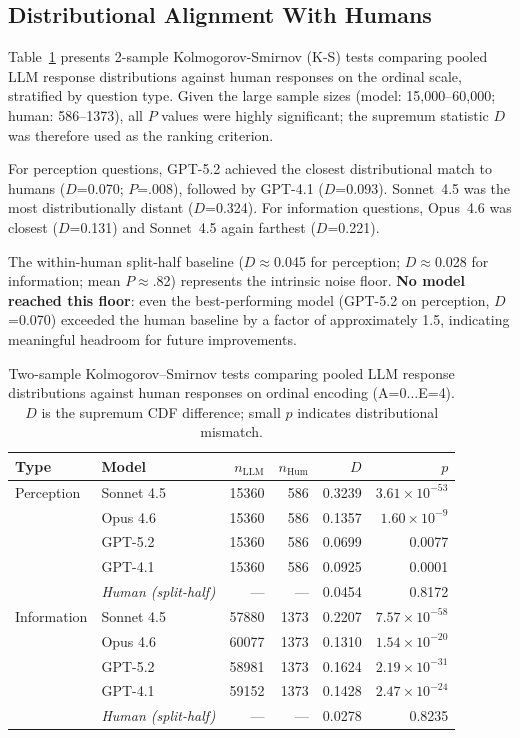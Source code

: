 \subsection{Distributional Alignment With Humans}

Table~\ref{tab:ks} presents 2-sample Kolmogorov-Smirnov (K-S) tests comparing
pooled LLM response distributions against human responses on the ordinal scale,
stratified by question type. Given the large sample sizes (model: 15,000--60,000;
human: 586--1373), all $P$ values were highly significant; the supremum
statistic $D$ was therefore used as the ranking criterion.

For perception questions, GPT-5.2 achieved the closest distributional match to
humans ($D$=0.070; $P$=.008), followed by GPT-4.1 ($D$=0.093).
Sonnet~4.5 was the most distributionally distant ($D$=0.324).
For information questions, Opus~4.6 was closest ($D$=0.131)
and Sonnet~4.5 again farthest ($D$=0.221).

The within-human split-half baseline ($D$$\approx$0.045 for perception;
$D$$\approx$0.028 for information; mean $P$$\approx$.82) represents
the intrinsic noise floor. \textbf{No model reached this floor}: even the
best-performing model (GPT-5.2 on perception, $D$=0.070) exceeded the
human baseline by a factor of approximately 1.5, indicating meaningful
headroom for future improvements.

\begin{table}[htbp]
\centering
\scriptsize
\setlength{\tabcolsep}{4pt}
\caption{Two-sample Kolmogorov--Smirnov tests comparing pooled LLM response distributions against human responses on ordinal encoding (A{=}0$\ldots$E{=}4). $D$ is the supremum CDF difference; small $p$ indicates distributional mismatch.}
\label{tab:ks}
\begin{tabular}{llrrrr}
\toprule
\textbf{Type} & \textbf{Model} & $n_{\text{LLM}}$ & $n_{\text{Hum}}$ & $D$ & $p$ \\
\midrule
Perception & Sonnet 4.5 & 15360 & 586 & 0.3239 & $3.61\times 10^{-53}$ \\
 & Opus 4.6 & 15360 & 586 & 0.1357 & $1.60\times 10^{-9}$ \\
 & GPT-5.2 & 15360 & 586 & 0.0699 & 0.0077 \\
 & GPT-4.1 & 15360 & 586 & 0.0925 & 0.0001 \\
 & \textit{Human (split-half)} & --- & --- & 0.0454 & 0.8172 \\
\midrule
Information & Sonnet 4.5 & 57880 & 1373 & 0.2207 & $7.57\times 10^{-58}$ \\
 & Opus 4.6 & 60077 & 1373 & 0.1310 & $1.54\times 10^{-20}$ \\
 & GPT-5.2 & 58981 & 1373 & 0.1624 & $2.19\times 10^{-31}$ \\
 & GPT-4.1 & 59152 & 1373 & 0.1428 & $2.47\times 10^{-24}$ \\
 & \textit{Human (split-half)} & --- & --- & 0.0278 & 0.8235 \\
\bottomrule
\end{tabular}
\end{table}

